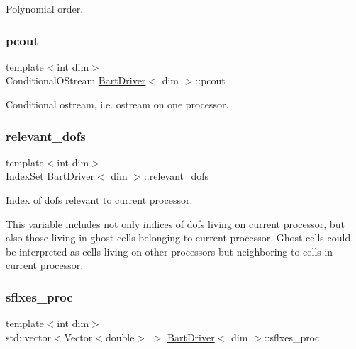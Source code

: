 Polynomial order. 

\mbox{\label{class_bart_driver_ad7bd8e33b7a6e67aa3d31527e40d18ea}} 
\subsubsection{\texorpdfstring{pcout}{pcout}}
{\footnotesize\ttfamily template$<$int dim$>$ \\
Conditional\+O\+Stream \hyperlink{class_bart_driver}{Bart\+Driver}$<$ dim $>$\+::pcout\hspace{0.3cm}{\ttfamily [private]}}



Conditional ostream, i.\+e. ostream on one processor. 

\mbox{\label{class_bart_driver_aabb9851e7b41f4a4b9395d79e4653ec7}} 
\subsubsection{\texorpdfstring{relevant\+\_\+dofs}{relevant\_dofs}}
{\footnotesize\ttfamily template$<$int dim$>$ \\
Index\+Set \hyperlink{class_bart_driver}{Bart\+Driver}$<$ dim $>$\+::relevant\+\_\+dofs\hspace{0.3cm}{\ttfamily [private]}}



Index of dofs relevant to current processor. 

This variable includes not only indices of dofs living on current processor, but also those living in ghost cells belonging to current processor. Ghost cells could be interpreted as cells living on other processors but neighboring to cells in current processor. \mbox{\label{class_bart_driver_a560ae94f3801fb64a35fdbcd0d8a772d}} 
\subsubsection{\texorpdfstring{sflxes\+\_\+proc}{sflxes\_proc}}
{\footnotesize\ttfamily template$<$int dim$>$ \\
std\+::vector$<$Vector$<$double$>$ $>$ \hyperlink{class_bart_driver}{Bart\+Driver}$<$ dim $>$\+::sflxes\+\_\+proc\hspace{0.3cm}{\ttfamily [private]}}



